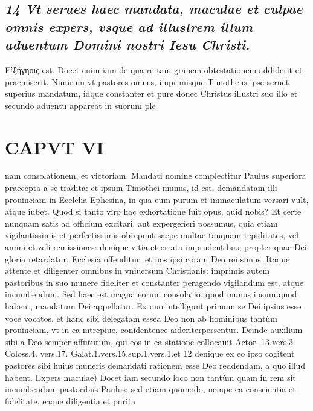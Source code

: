 \documentclass{article}
\begin{document}
\begin{pages}
\subsection*{\textit{14 Vt serues haec mandata, maculae et culpae omnis expers, vsque ad illustrem illum aduentum Domini nostri Iesu Christi. }}\pstart Ε’ξήγηοις est. Docet enim iam de qua re tam grauem obtestationem addiderit et praemiserit. Nimirum vt pastores omnes, imprimisque Timotheus ipse seruet superius mandatum, idque constanter et pure donec Christus illustri suo illo et secundo aduentu appareat in suorum ple\pend
\section*{CAPVT VI }
\marginpar{[ p.475 ]}\pstart nam consolationem, et victoriam. Mandati nomine complectitur Paulus superiora praecepta a se tradita: et ipsum Timothei munus, id est, demandatam illi prouinciam in Ecclelia Ephesina, in qua eum purum et immaculatum versari vult, atque iubet. Quod si tanto viro hac exhortatione fuit opus, quid nobis? Et certe nunquam satis ad officium excitari, aut expergefieri possumus, quia etiam vigilantissimis et perfectissimis obrepunt saepe multae tanquam tepiditates, vel animi et zeli remissiones: denique vitia et errata imprudentibus, propter quae Dei gloria retardatur, Ecclesia offenditur, et nos ipsi coram Deo rei simus. Itaque attente et diligenter omnibus in vniuersum Christianis: imprimis autem pastoribus in suo munere fideliter et constanter peragendo vigilandum est, atque incumbendum.  \pend\pstart Sed haec est magna eorum consolatio, quod munus ipsum quod habent, mandatum Dei appellatur. Ex quo intelligunt primum se Dei ipsius esse voce vocatos, et hanc sibi delegatam essea Deo non ab hominibus tantùm prouinciam, vt in ea mtrcpiue, conidentence aideriterpersentur. Deinde auxilium sibi a Deo semper affuturum, qui eos in ea statione collocauit Actor. 13.vers.3. Coloss.4. vers.17. Galat.1.vers.15.sup.1.vers.1.et 12 denique ex eo ipso cogitent pastores sibi huius muneris demandati rationem esse Deo reddendam, a quo illud habent.  \pend\pstart Expers maculae) Docet iam secundo loco non tantùm quam in rem sit incumbendum pastoribus Paulus: sed etiam quomodo, nempe ea conscientia et fidelitate, eaque diligentia et purita\pend

\end{pages}
\end{document}
